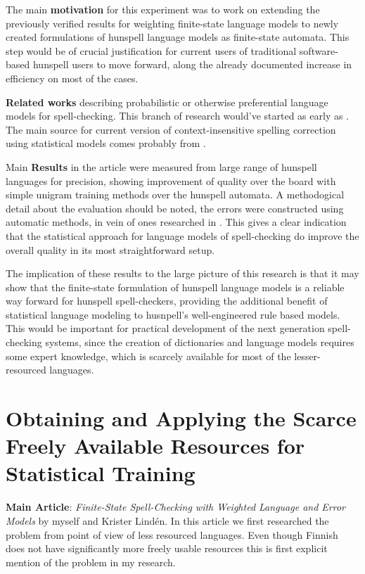 \documentclass[officiallayout,draft]{unihelcompling}
\begin{document}
The main \textbf{motivation} for this experiment was to work on extending the
previously verified results for weighting finite-state language models to
newly created formulations of hunspell language models as finite-state
automata. This step would be of crucial justification for current users of
traditional software-based hunspell users to move forward, along the already
documented increase in efficiency on most of the cases. 

\textbf{Related works} describing probabilistic or otherwise preferential
language models for spell-checking. This branch of research would've started
as early as \cite{}. The main source for current version of 
context-insensitive spelling correction using statistical models comes
probably from \cite{church1991probability}.

Main \textbf{Results} in the article were measured from large range of
hunspell languages for precision, showing improvement of quality over the
board with simple unigram training methods over the hunspell automata. A
methodogical detail about the evaluation should be noted, the errors were
constructed using automatic methods, in vein of ones researched in
\cite{bigert200xmisplel,bigert200x}. This gives a clear indication that the
statistical approach for language models of spell-checking do improve the
overall quality in its most straightforward setup.

The implication of these results to the large picture of this research is
that it may show that the finite-state formulation of hunspell language models
is a reliable way forward for hunspell spell-checkers, providing the additional
benefit of statistical language modeling to husnpell's well-engineered
rule based models. This would be important for practical development of
the next generation spell-checking systems, since the creation of dictionaries
and language models requires some expert knowledge, which is scarcely available
for most of the lesser-resourced languages.

\section{Obtaining and Applying the Scarce Freely Available Resources for
Statistical Training}

\textbf{Main Article}: \emph{Finite-State Spell-Checking with Weighted Language
and Error Models} by myself and Krister Lindén. In this article we first
researched the problem from point of view of less resourced languages. Even
though Finnish does not have significantly more freely usable resources this
is first explicit mention of the problem in my research.
\end{document}
